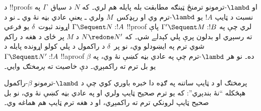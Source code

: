 \documentclass[../../../include/open-logic-section]{subfiles}
\begin{document}
د !!{proof}s او $\lambd$-ترمونو ترمنځ ټينګه مطابقت
بله پايله هم لري۔ که $N$ د سياق~$\Gamma$ په نسبت
د ټايپ $!A$ يو $\lambd$-ترم وي او رېډکس~$M$ ولري
ـ يعنې عادي بڼه نۀ وي ـ نو د $\Gamma \Sequent N : !A$
اړوند  ثبوت~$\delta$ يو فرعي !!{proof}
لري چې په $\Gamma' \Sequent M: !B$ پاې ته رسېږي
او بدلون پرې پلي کېدلے شي۔ که $N \redone N'$ د
$M$ پر ځای د هغه د راکم شوي ترم په ايښودلو وي، نو
پر~$\delta$ د راکمول د پلي کولو اړونده پايله د
$\Gamma \Sequent N' : !A$ !!a{proof} ده۔ نو هر
$\lambd$-ترم چې په عادي بڼه کښې نۀ وي، په $\beta$
يو بل ترم ته راکمېږي۔ دې خاصيت ته \emph{پرمختګ} وايي۔

پرمختګ او د ټايپ ساتنه په ګډه دا خبره باوري کوي چې
د $\lambd$-ترمونو $\beta$-راکمول هېڅکله ``نۀ بندېږي'':
که يو ترم صحيح ټايپ ولري او په عادي بڼه کښې نۀ وي، نو
بل صحيح ټايپ لرونکي ترم ته راکمېږي، او د هغه ترم ټايپ
هم هماغه وي۔
\end{document}

